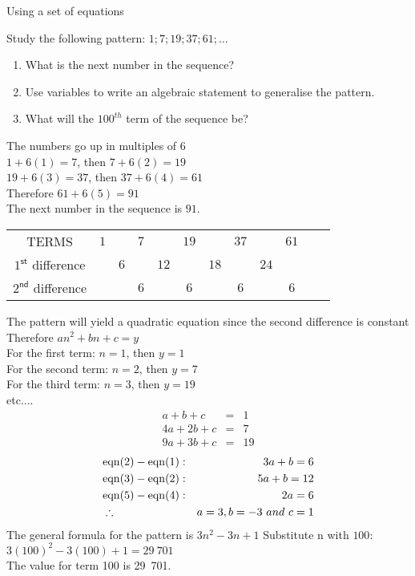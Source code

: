 \begin{wex}{Using a set of equations}
{Study the following pattern: $1; 7; 19; 37; 61; \ldots$
\begin{enumerate}
\item{What is the next number in the sequence?}
\item{Use variables to write an algebraic statement to generalise the pattern.}
\item{What will the $100^{th}$ term of the sequence be?}
\end{enumerate}
}{
The numbers go up in multiples of $6$\\
$1 + 6(1) = 7$,  then $7 + 6(2) = 19$\\
$19+ 6(3)=37$, then $37+6(4)=61$\\
Therefore $61 + 6(5) = 91$\\
The next number in the sequence is $91$.
\begin{center}
\begin{tabular}{cccccccccccc}
TERMS & $1$ && $7$ && $19$ && $37$ && $61$ & \\
$1^{\textsf{st}}$ difference && $6$ && $12$ && $18$ && $24$ \\ 
$2^{\textsf{nd}}$ difference &&& $6$ && $6$ && $6$ && $6$& \\
\end{tabular}
\end{center}
The pattern will yield a quadratic equation since the second difference is
constant\\
Therefore $an^2 + bn + c = y$\\
For the first term: $n = 1$,  then $y = 1$ \\
For the second term: $n = 2$, then $y = 7$ \\  
For the third term:  $n = 3$,  then $y = 19$ \\
etc....
\begin{eqnarray}
a+b+c &=& 1\\
4a + 2b + c &=& 7\\
9a + 3b + c &=& 19
\end{eqnarray}
\begin{eqnarray}
&\rm{eqn} (2) - \rm{eqn} (1):& 3a + b = 6\\
&\rm{eqn} (3) - \rm{eqn} (2):& 5a + b = 12\\
&\rm{eqn} (5) - \rm{eqn} (4):& 2a = 6\\
&\therefore & a = 3, b = -3 ~and~ c = 1
\end{eqnarray}
The general formula for the pattern is $3n^2 - 3n + 1$
Substitute n with $100$:\\
$3(100)^2 - 3(100) + 1 = 29~701$\\
The value for term 100 is 29~701.
}
\end{wex}

